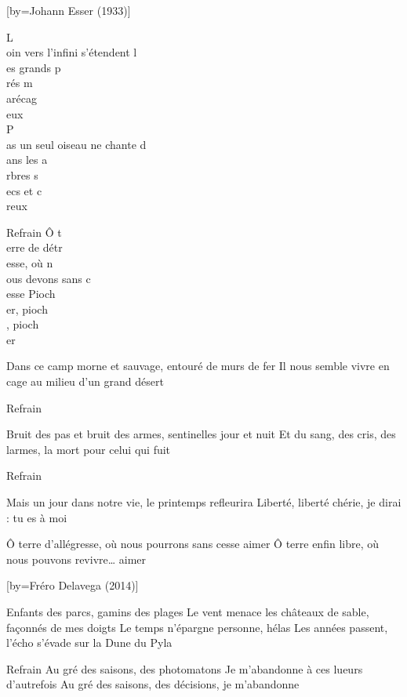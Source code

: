 [by={Johann Esser (1933)}]

\beginverse
L\\[Lam]oin vers l’infini s’étendent l\\[Rém]es grands p\\[Lam]rés m\\[Mi]arécag\\[Lam]eux \\[Sol]
P\\[Do]as un seul oiseau ne chante d\\[Rém]ans les a\\[Lam]rbres s\\[Mi]ecs et c\\[Lam]reux \\[Sol]
\endverse

\beginverse
Refrain
Ô t\\[Do]erre de détr\\[Sol7]esse, où n\\[Lam]ous devons sans c\\[Mi]esse
Pioch\\[Lam]er, pioch\\[Mi], pioch\\[Lam]er
\endverse

\beginverse
Dans ce camp morne et sauvage, entouré de murs de fer
Il nous semble vivre en cage au milieu d’un grand désert
\endverse

\beginverse
Refrain
\endverse

\beginverse
Bruit des pas et bruit des armes, sentinelles jour et nuit
Et du sang, des cris, des larmes, la mort pour celui qui fuit
\endverse

\beginverse
Refrain
\endverse

\beginverse
Mais un jour dans notre vie, le printemps refleurira
Liberté, liberté chérie, je dirai : tu es à moi \!
\endverse

\beginverse
Ô terre d’allégresse, où nous pourrons sans cesse aimer
Ô terre enfin libre, où nous pouvons revivre… aimer
\endverse

[by={Fréro Delavega (2014)}]

\beginverse
Enfants des parcs, gamins des plages
Le vent menace les châteaux de sable, façonnés de mes doigts
Le temps n'épargne personne, hélas
Les années passent, l'écho s'évade sur la Dune du Pyla
\endverse

\beginverse
Refrain
Au gré des saisons, des photomatons
Je m'abandonne à ces lueurs d'autrefois
Au gré des saisons, des décisions, je m'abandonne
\endverse

